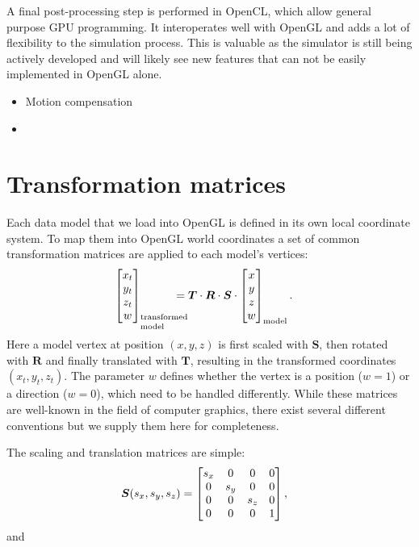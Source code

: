 A final post-processing step is performed in OpenCL, which allow general purpose GPU programming. It interoperates well with OpenGL and adds a lot of flexibility to the simulation process. This is valuable as the simulator is still being actively developed and will likely see new features that can not be easily implemented in OpenGL alone.

\begin{itemize}
\item Motion compensation
\item 
\end{itemize}

\ifPhdDoc
\clearpage
\appendix
\renewcommand\thesection{\Roman{section}}
\else
\appendices
\fi


\section{Transformation matrices}\label{transformation_matrices} 

Each data model that we load into OpenGL is defined in its own local coordinate system. To map them into OpenGL world coordinates a set of common transformation matrices are applied to each model's vertices:
%
\begin{align}
\bmat{x_t \\ y_t \\ z_t \\ w}_\text{\parbox{1cm}{\setlength\baselineskip{0.3cm}transformed\\model}} &= \boldsymbol{T} \cdot \boldsymbol{R} \cdot \boldsymbol{S} \cdot \bmat{x \\ y \\ z \\ w}_\text{model}.
\end{align}
%
Here a model vertex at position $(x,y,z)$ is first scaled with $\boldsymbol{S}$, then rotated with $\boldsymbol{R}$ and finally translated with $\boldsymbol{T}$, resulting in the transformed coordinates $(x_t,y_t,z_t)$. The parameter $w$ defines whether the vertex is a position ($w=1$) or a direction ($w=0$), which need to be handled differently. While these matrices are well-known in the field of computer graphics, there exist several different conventions but we supply them here for completeness.

The scaling and translation matrices are simple:
%
\begin{align}
\boldsymbol{S}(s_x,s_y,s_z) &= \begin{bmatrix}
   s_x  &  0    &  0    &  0 \\
   0    &  s_y  &  0    &  0 \\
   0    &  0    &  s_z  &  0 \\
   0    &  0    &  0    &  1 \\
  \end{bmatrix},
  \end{align}
%
and

